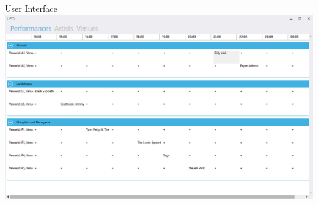 \begin{section}{User Interface}
\includegraphics[angle=0, scale=0.45]{./img/viewperformance.PNG}
\FloatBarrier


\end{section}